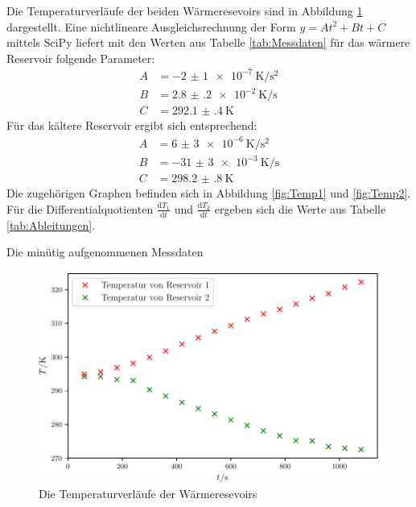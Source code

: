 Die Temperaturverläufe der beiden Wärmeresevoirs sind in Abbildung \ref{fig:Temperaturverläufe} dargestellt.
\noindent  Eine nichtlineare Ausgleichsrechnung der Form $y = At^2+Bt+C$ mittels SciPy \cite{scipy} liefert mit den Werten aus Tabelle \ref{tab:Messdaten} für das wärmere Reservoir folgende Parameter:
\begin{align*}
	A &= \SI{-2(1)e-7}{\kelvin\per\second\squared}\\
	B &= \SI{2.8(2)e-2}{\kelvin\per\second}\\
	C &= \SI{292.1(4)}{\kelvin}
\end{align*}
Für das kältere Reservoir ergibt sich entsprechend:
\begin{align*}
	A &= \SI{6(3)e-6}{\kelvin\per\second\squared}\\
	B &= \SI{-31(3)e-3}{\kelvin\per\second}\\
	C &= \SI{298.2(8)}{\kelvin}
\end{align*}
Die zugehörigen Graphen befinden sich in Abbildung \ref{fig:Temp1} und \ref{fig:Temp2}.
Für die Differentialquotienten $\frac{\text{d}T_1}{\text{d}t}$ und $\frac{\text{d}T_2}{\text{d}t}$ ergeben sich die Werte aus Tabelle \ref{tab:Ableitungen}.
\begin{table}
 	\centering
  	\caption{Die minütig aufgenommenen Messdaten}	
   	\label{tab:Messdaten}
\end{table}
\begin{figure}
	\centering
	\includegraphics[scale = 1,keepaspectratio]
	{content/images/Temperaturen.pdf}
	\caption{Die Temperaturverläufe der Wärmeresevoirs}
	\label{fig:Temperaturverläufe}
\end{figure}
